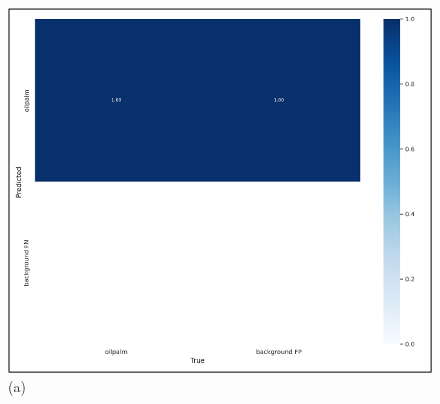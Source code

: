 \begin{figure}[H]
	\vspace{-0.1cm}
	\begin{center}
		\includegraphics[width=1\columnwidth]{bab4/Gambar/Picture29.1.png}
		(a)
	\end{center}
	\vspace{-0.2cm}
\end{figure}

